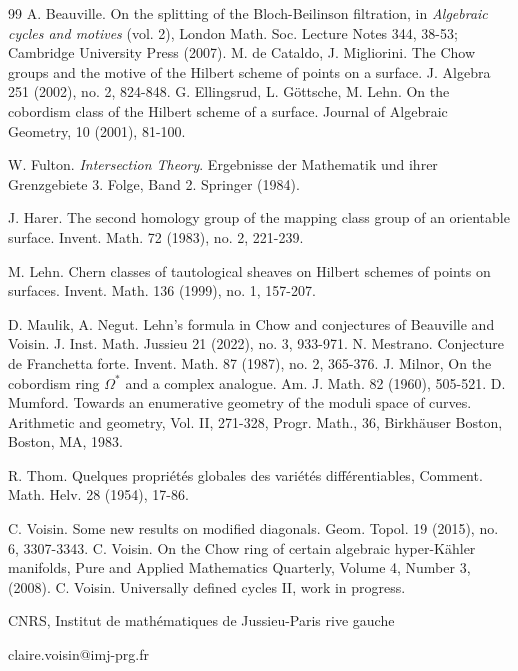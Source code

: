 \documentclass[10pt]{article}
\begin{document}
\begin{thebibliography}{99}
 A. Beauville.  On the splitting of the Bloch-Beilinson filtration, in
 {\it Algebraic cycles and motives} (vol. 2), London Math. Soc. Lecture Notes 344, 38-53; Cambridge University Press (2007).
  M. de Cataldo, J. Migliorini. The Chow groups and the motive
 of the Hilbert scheme of points on a surface. J. Algebra 251 (2002), no. 2, 824-848.
 G. Ellingsrud, L. G\"ottsche, M. Lehn. On the cobordism class of the Hilbert scheme of a
surface. Journal of Algebraic Geometry, 10 (2001), 81-100.

 W. Fulton. \textit{Intersection Theory}. Ergebnisse der Mathematik und ihrer
  Grenzgebiete 3. Folge, Band 2. Springer (1984).


 J. Harer. The second homology group of the mapping class group of an orientable surface. Invent. Math. 72 (1983), no. 2, 221-239.


 M. Lehn. Chern classes of tautological sheaves on Hilbert schemes of points on surfaces. Invent. Math. 136 (1999), no. 1, 157-207.

 D. Maulik, A. Negut. Lehn's formula in Chow and conjectures of Beauville and Voisin. J. Inst. Math. Jussieu 21 (2022), no. 3, 933-971.
     N.
Mestrano.
Conjecture de Franchetta forte.
Invent. Math. 87 (1987), no. 2, 365-376.
 J. Milnor, On the cobordism ring
$\Omega^*$ and a complex analogue. Am. J.
Math. 82 (1960), 505-521.
 D. Mumford. Towards an enumerative geometry of the moduli space of curves. Arithmetic and geometry, Vol. II, 271-328,
Progr. Math., 36, Birkh\"{a}user Boston, Boston, MA, 1983.

  R. Thom. Quelques propriétés globales des variétés différentiables, Comment. Math.
Helv. 28 (1954), 17-86.

 C. Voisin. Some new   results on  modified diagonals. Geom. Topol. 19 (2015), no. 6, 3307-3343.
     C. Voisin. On the Chow ring of certain algebraic hyper-K\"ahler manifolds, Pure and Applied Mathematics Quarterly,
 Volume 4, Number 3, (2008).
 C. Voisin.  Universally defined cycles II, work in progress.


\end{thebibliography}
CNRS, Institut de math\'{e}matiques de Jussieu-Paris rive gauche

 claire.voisin@imj-prg.fr
    
\end{document}
